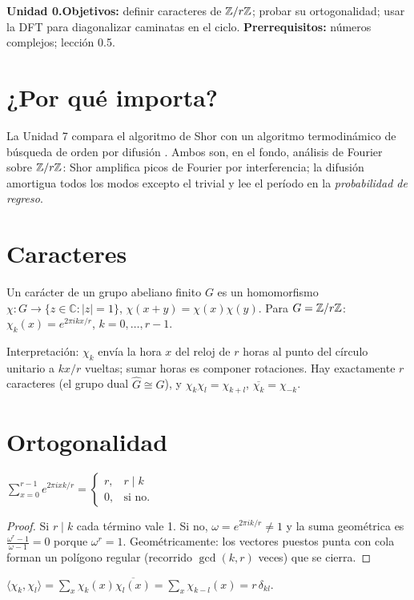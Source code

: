 \documentclass[11pt,a4paper]{article}
\begin{document}

\noindent\textbf{Unidad 0.}\quad\textbf{Objetivos:} definir caracteres de $\mathbb{Z}/r\mathbb{Z}$; probar su ortogonalidad;
usar la DFT para diagonalizar caminatas en el ciclo. \textbf{Prerrequisitos:} números complejos; lección 0.5.

\section{¿Por qué importa?}
La Unidad 7 compara el algoritmo de Shor con un algoritmo termodinámico de búsqueda de orden por difusión
\cite{cadavid1,cadavid2}. Ambos son, en el fondo, análisis de Fourier sobre $\mathbb{Z}/r\mathbb{Z}$: Shor amplifica picos de
Fourier por interferencia; la difusión amortigua todos los modos excepto el trivial y lee el período en la
\emph{probabilidad de regreso}.

\section{Caracteres}
\begin{definicion}[ (carácter)]
Un carácter de un grupo abeliano finito $G$ es un homomorfismo $\chi:G\to\{z\in\mathbb C:|z|=1\}$,
$\chi(x+y)=\chi(x)\chi(y)$. Para $G=\mathbb{Z}/r\mathbb{Z}$: $\chi_k(x)=e^{2\pi ikx/r}$, $k=0,\dots,r-1$.
\end{definicion}
Interpretación: $\chi_k$ envía la hora $x$ del reloj de $r$ horas al punto del círculo unitario a $kx/r$ vueltas;
sumar horas es componer rotaciones. Hay exactamente $r$ caracteres (el grupo dual $\hat G\cong G$), y
$\chi_k\chi_l=\chi_{k+l}$, $\overline{\chi_k}=\chi_{-k}$.

\section{Ortogonalidad}
\begin{lema}
$\displaystyle\sum_{x=0}^{r-1}e^{2\pi ixk/r}=\begin{cases}r,&r\mid k\\0,&\text{si no.}\end{cases}$
\end{lema}
\begin{proof}
Si $r\mid k$ cada término vale 1. Si no, $\omega=e^{2\pi ik/r}\neq1$ y la suma geométrica es
$\frac{\omega^r-1}{\omega-1}=0$ porque $\omega^r=1$. Geométricamente: los vectores puestos punta con cola forman un
polígono regular (recorrido $\gcd(k,r)$ veces) que se cierra.
\end{proof}
\begin{resultado}[ (ortogonalidad)]
$\langle\chi_k,\chi_l\rangle=\sum_x\chi_k(x)\overline{\chi_l(x)}=\sum_x\chi_{k-l}(x)=r\,\delta_{kl}$.
\end{resultado}
\end{document}
